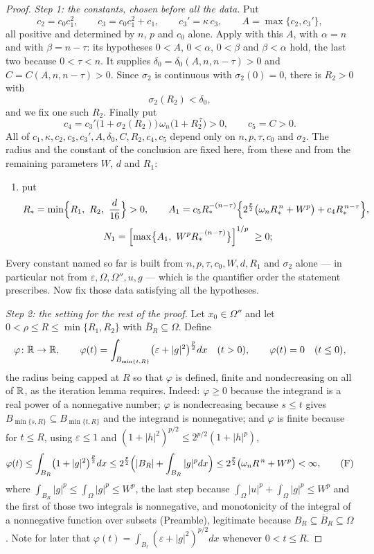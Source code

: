 \begin{proof}
\emph{Step 1: the constants, chosen before all the data.}  Put
\[
c_2=c_0c_1^2,\qquad
c_3=c_0c_1^2+c_1,\qquad
c_3'=\kappa\,c_3,\qquad
A=\max\{c_2,c_3'\} ,
\]
all positive and determined by $n$, $p$ and $c_0$ alone.  Apply
 with this $A$, with $\alpha=n$ and with
$\beta=n-\tau$: its hypotheses $0<A$, $0<\alpha$, $0<\beta$ and $\beta<\alpha$
hold, the last two because $0<\tau<n$.  It supplies
$\delta_0=\delta_0(A,n,n-\tau)>0$ and $C=C(A,n,n-\tau)>0$.  Since $\sigma_2$ is
continuous with $\sigma_2(0)=0$, there is $R_2>0$ with
\[
\sigma_2(R_2)<\delta_0 ,
\]
and we fix one such $R_2$.  Finally put
\[
c_4=c_3'\bigl(1+\sigma_2(R_2)\bigr)\,\omega_n\bigl(1+R_2^{\,\tau}\bigr)>0,
\qquad
c_5=C>0 .
\]
All of $c_1,\kappa,c_2,c_3,c_3',A,\delta_0,C,R_2,c_4,c_5$ depend only on
$n,p,\tau,c_0$ and $\sigma_2$.  The radius and the constant of the conclusion
are fixed here, from these and from the remaining parameters $W$, $d$ and
$R_1$:
\begin{enumerate}
\item[(1e)] put
  \[
  R_\ast=\min\Bigl\{R_1,\ R_2,\ \frac d{16}\Bigr\}>0,
  \qquad
  A_1=c_5R_\ast^{-(n-\tau)}\Bigl\{2^{\frac p2}\bigl(\omega_nR_\ast^{\,n}+W^p\bigr)
      +c_4R_\ast^{\,n-\tau}\Bigr\},
  \]
  \[
  N_1=\Bigl[\max\bigl\{A_1,\ W^pR_\ast^{-(n-\tau)}\bigr\}\Bigr]^{1/p}\ \ge0 ;
  \]
\end{enumerate}
Every constant named so far is built from $n,p,\tau,c_0,W,d,R_1$ and $\sigma_2$
alone --- in particular not from $\varepsilon,\Omega,\Omega'',u,g$ --- which is
the quantifier order the statement prescribes.  Now fix those data satisfying
all the hypotheses.

\emph{Step 2: the setting for the rest of the proof.}  Let $x_0\in\Omega''$ and
let $0<\rho\le R\le\min\{R_1,R_2\}$ with $\overline B_R\subseteq\Omega$.  Define
\[
\varphi\colon\mathbb{R}\to\mathbb{R},\qquad
\varphi(t)=\int_{B_{\min\{t,R\}}}\bigl(\varepsilon+|g|^2\bigr)^{\frac p2}dx
\quad(t>0),\qquad \varphi(t)=0\quad(t\le0),
\]
the radius being capped at $R$ so that $\varphi$ is defined, finite and
nondecreasing on all of $\mathbb{R}$, as the iteration lemma requires.  Indeed:
$\varphi\ge0$ because the integrand is a real power of a nonnegative number;
$\varphi$ is nondecreasing because $s\le t$ gives
$B_{\min\{s,R\}}\subseteq B_{\min\{t,R\}}$ and the integrand is nonnegative; and
$\varphi$ is finite because for $t\le R$, using $\varepsilon\le1$ and
$(1+|h|^2)^{p/2}\le2^{p/2}(1+|h|^{p})$,
\[
\varphi(t)\le\int_{B_R}\bigl(1+|g|^2\bigr)^{\frac p2}dx
\le2^{\frac p2}\Bigl(|B_R|+\int_{B_R}|g|^{p}dx\Bigr)
\le2^{\frac p2}\bigl(\omega_nR^{\,n}+W^{p}\bigr)<\infty ,
\tag{F}
\]
where $\int_{B_R}|g|^p\le\int_\Omega|g|^p\le W^p$, the last step because
$\int_\Omega|u|^p+\int_\Omega|g|^p\le W^p$ and the first of those two integrals
is nonnegative, and
monotonicity of the integral of a nonnegative function over subsets (Preamble),
legitimate because $B_R\subseteq\overline B_R\subseteq\Omega$.  Note for later that $\varphi(t)=\int_{B_t}(\varepsilon+|g|^2)^{p/2}dx$
whenever $0<t\le R$.


\end{proof}
